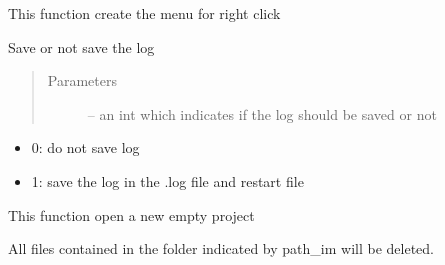 \documentclass[letterpaper,10pt,english]{sphinxmanual}
\begin{document}
\begin{fulllineitems}
\begin{fulllineitems}
\end{fulllineitems}


\begin{fulllineitems}
\label{\detokenize{index:src_GUI.Main_windows_1.MainWindows.create_menu_right}}
This function create the menu for right click

\end{fulllineitems}


\begin{fulllineitems}
\label{\detokenize{index:src_GUI.Main_windows_1.MainWindows.do_log}}
Save or not save the log
\begin{quote}\begin{description}
\item[{Parameters}] \leavevmode
{} -- an int which indicates if the log should be saved or not

\end{description}\end{quote}
\begin{itemize}
\item {} 
0: do not save log

\item {} 
1: save the log in the .log file and restart file

\end{itemize}

\end{fulllineitems}


\begin{fulllineitems}
\label{\detokenize{index:src_GUI.Main_windows_1.MainWindows.empty_project}}
This function open a new empty project

\end{fulllineitems}


\begin{fulllineitems}
\label{\detokenize{index:src_GUI.Main_windows_1.MainWindows.erase_pict}}
All files contained in the folder indicated by path\_im will be deleted.


\end{fulllineitems}
\end{fulllineitems}
\end{document}
